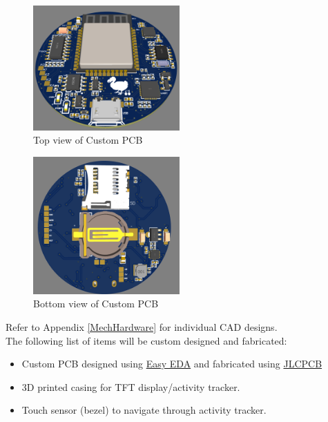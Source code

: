 \documentclass[12pt, titlepage]{article}
\begin{document}
\begin{figure}[H]
	\begin{center}
		 \includegraphics[width=0.5\textwidth]{PCBTOP}
		\caption{Top view of Custom PCB}
		\label{PCBTOP} 
	\end{center}
\end{figure}

\begin{figure}[H]
	\begin{center}
		 \includegraphics[width=0.5\textwidth]{PCBBOTTOM}
		\caption{Bottom view of Custom PCB}
		\label{PCBBOTTOM} 
	\end{center}
\end{figure}
\newpage
Refer to Appendix \ref{MechHardware} for individual CAD designs.\\

The following list of items will be custom designed and fabricated:
\begin{itemize}
\item{Custom PCB designed using \href{https://easyeda.com/}{Easy EDA} and fabricated using \href{https://jlcpcb.com/}{JLCPCB}}
\item{3D printed casing for TFT display/activity tracker.}
\item{Touch sensor (bezel) to navigate through activity tracker.}
\end{itemize}
\end{document}
